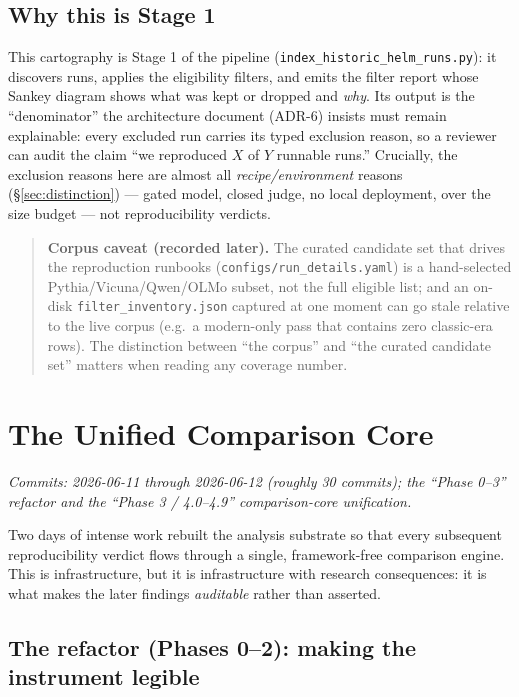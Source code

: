 \documentclass[11pt]{report}
\newcommand{\file}[1]{\texttt{#1}}
\begin{document}
\section{Why this is Stage 1}

This cartography is Stage 1 of the pipeline
(\file{index\_historic\_helm\_runs.py}): it discovers runs, applies the eligibility
filters, and emits the filter report whose Sankey diagram shows what was kept or
dropped and \emph{why}. Its output is the ``denominator'' the architecture
document (ADR-6) insists must remain explainable: every excluded run carries its
typed exclusion reason, so a reviewer can audit the claim ``we reproduced $X$ of
$Y$ runnable runs.'' Crucially, the exclusion reasons here are almost all
\emph{recipe/environment} reasons (\S\ref{sec:distinction}) --- gated model,
closed judge, no local deployment, over the size budget --- not reproducibility
verdicts.

\begin{quote}\small
\textbf{Corpus caveat (recorded later).} The curated candidate set that drives the
reproduction runbooks (\file{configs/run\_details.yaml}) is a hand-selected
Pythia/Vicuna/Qwen/OLMo subset, not the full eligible list; and an on-disk
\file{filter\_inventory.json} captured at one moment can go stale relative to the
live corpus (e.g.\ a modern-only pass that contains zero classic-era rows). The
distinction between ``the corpus'' and ``the curated candidate set'' matters when
reading any coverage number.
\end{quote}

\chapter{The Unified Comparison Core}
\label{chap:core}

\emph{Commits: 2026-06-11 through 2026-06-12 (roughly 30 commits); the ``Phase 0--3''
refactor and the ``Phase 3 / 4.0--4.9'' comparison-core unification.}

Two days of intense work rebuilt the analysis substrate so that every subsequent
reproducibility verdict flows through a single, framework-free comparison engine.
This is infrastructure, but it is infrastructure with research consequences: it is
what makes the later findings \emph{auditable} rather than asserted.

\section{The refactor (Phases 0--2): making the instrument legible}
\end{document}
